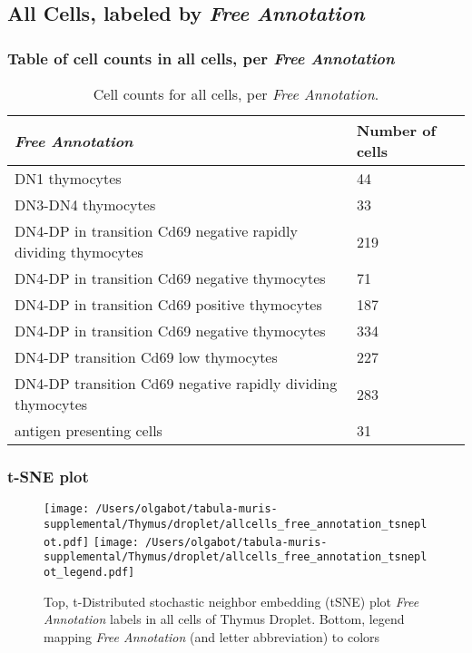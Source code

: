 \clearpage

\subsection{All Cells, labeled by \emph{Free Annotation}}
\subsubsection{Table of cell counts in all cells, per \emph{Free Annotation}}\begin{table}[h]
\centering
\label{my-label}
\begin{tabular}{@{}ll@{}}
\toprule

\emph{Free Annotation}& Number of cells \\ \midrule
DN1 thymocytes & 44 \\

DN3-DN4 thymocytes & 33 \\

DN4-DP in transition Cd69 negative rapidly dividing thymocytes & 219 \\

DN4-DP in transition Cd69 negative thymocytes & 71 \\

DN4-DP in transition Cd69 positive thymocytes & 187 \\

DN4-DP in transition Cd69 negative thymocytes & 334 \\

DN4-DP transition Cd69 low thymocytes & 227 \\

DN4-DP transition Cd69 negative rapidly dividing thymocytes & 283 \\

antigen presenting cells & 31 \\
\bottomrule
\end{tabular}
\caption{Cell counts for all cells, per \emph{Free Annotation}.}
\end{table}

\clearpage
\subsubsection{t-SNE plot}
\begin{figure}[h]
\centering
\texttt{[image: /Users/olgabot/tabula-muris-supplemental/Thymus/droplet/allcells\_free\_annotation\_tsneplot.pdf]}
\texttt{[image: /Users/olgabot/tabula-muris-supplemental/Thymus/droplet/allcells\_free\_annotation\_tsneplot\_legend.pdf]}
\caption{Top, t-Distributed stochastic neighbor embedding (tSNE) plot  \emph{Free Annotation} labels in all cells of Thymus Droplet. Bottom, legend mapping \emph{Free Annotation} (and letter abbreviation) to colors}
\end{figure}


